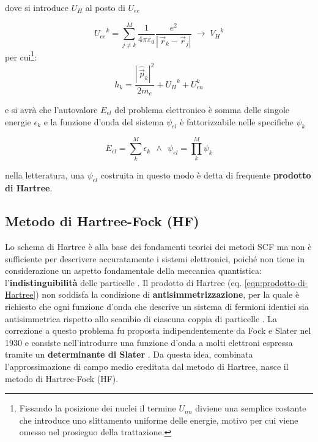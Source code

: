 dove si introduce $U_H$ al posto di $U_{ee}$

\begin{equation}
    {U_{ee}}^{k} = \sum_{j \neq k}^{M} \frac{1}{4\pi\varepsilon_0} \frac{e^2}{|\,\vec{r}_k - \vec{r}_j |}
    \;\longrightarrow\;
    {V_{H}}^{k}
\end{equation}
per cui\footnote{Fissando la posizione dei nuclei il termine $U_{nn}$ diviene una semplice costante che introduce uno slittamento uniforme delle energie, motivo per cui viene omesso nel prosieguo della trattazione.}:
\begin{equation}\label{eqn:hamiltoniana-singola-particella}
    h_{k} = \frac{|\,\hat{\vec{p}}_k|^2}{2m_e} + 
    {U_{H}}^{k} + U_{en}^{k}
\end{equation}


e si avrà che l'autovalore $E_{el}$ del problema elettronico è somma delle singole energie $\epsilon_k$ e la funzione d'onda del sistema $\psi_{el}$ è fattorizzabile nelle specifiche $\psi_k$

\begin{equation}\label{eqn:prodotto-di-Hartree}
    E_{el} = \sum_{k}^{M} \epsilon_k\ \ \land\ \ 
    \psi_{el} = \prod_{k}^{M} \psi_k
\end{equation}

nella letteratura, una $\psi_{el}$ costruita in questo modo è detta di frequente \textbf{prodotto di Hartree}.


\subsection{Metodo di Hartree-Fock (HF)}\label{subsec:Hartree-Fock}

Lo schema di Hartree è alla base dei fondamenti teorici dei metodi SCF ma non è sufficiente per descrivere accuratamente i sistemi elettronici, poiché non tiene in considerazione un aspetto fondamentale della meccanica quantistica: l'\textbf{indistinguibilità} delle particelle \cite{computational_chem}.
Il prodotto di Hartree (eq. \ref{eqn:prodotto-di-Hartree}) non soddisfa la condizione di \textbf{antisimmetrizzazione}, per la quale è richiesto che ogni funzione d'onda che descrive un sistema di fermioni identici sia antisimmetrica rispetto allo scambio di ciascuna coppia di particelle \cite{Sherrill_2000}.
La correzione a questo problema fu proposta indipendentemente da Fock e Slater nel 1930 e consiste nell'introdurre una funzione d'onda a molti elettroni espressa tramite un \textbf{determinante di Slater} \cite{Echenique_2007}. Da questa idea, combinata l'approssimazione di campo medio ereditata dal metodo di Hartree, nasce il metodo di Hartree-Fock (HF).

